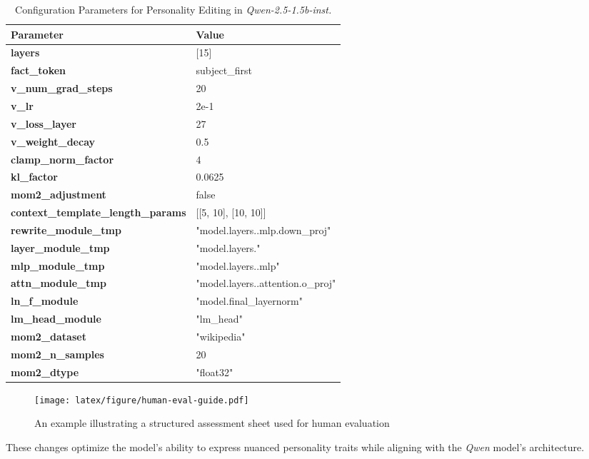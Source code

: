 \begin{table*}[ht]
\centering
\small
{}
\renewcommand{\arraystretch}{1.2} %
\begin{tabular}{l|l}
\toprule
\textbf{Parameter} & \textbf{Value} \\ 
\midrule
\textbf{layers} & [15] \\ 
\textbf{fact\_token} & subject\_first \\ 
\textbf{v\_num\_grad\_steps} & 20 \\ 
\textbf{v\_lr} & 2e-1 \\ 
\textbf{v\_loss\_layer} & 27 \\ 
\textbf{v\_weight\_decay} & 0.5 \\ 
\textbf{clamp\_norm\_factor} & 4 \\ 
\textbf{kl\_factor} & 0.0625 \\ 
\textbf{mom2\_adjustment} & false \\ 
\textbf{context\_template\_length\_params} & [[5, 10], [10, 10]] \\ 
\textbf{rewrite\_module\_tmp} & "model.layers.{}.mlp.down\_proj" \\ 
\textbf{layer\_module\_tmp} & "model.layers.{}" \\ 
\textbf{mlp\_module\_tmp} & "model.layers.{}.mlp" \\ 
\textbf{attn\_module\_tmp} & "model.layers.{}.attention.o\_proj" \\ 
\textbf{ln\_f\_module} & "model.final\_layernorm" \\ 
\textbf{lm\_head\_module} & "lm\_head" \\ 
\textbf{mom2\_dataset} & "wikipedia" \\ 
\textbf{mom2\_n\_samples} & 20 \\ 
\textbf{mom2\_dtype} & "float32" \\
\bottomrule
\end{tabular}
\caption{Configuration Parameters for Personality Editing in \textit{Qwen-2.5-1.5b-inst.}}
\label{tab:model_config}
\end{table*}

\begin{figure*}[!ht]
\centering
\texttt{[image: latex/figure/human-eval-guide.pdf]}
\caption{An example illustrating a structured assessment sheet used for human evaluation}
\label{fig:human-eval-guide}
\end{figure*}
These changes optimize the model's ability to express nuanced personality traits while aligning with the \textit{Qwen} model’s architecture.

